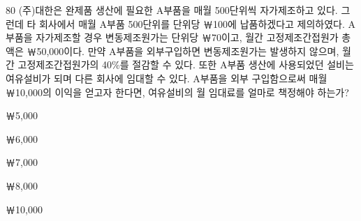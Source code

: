 \begin{question}{80}
(주)대한은 완제품 생산에 필요한 A부품을 매월 500단위씩 자가제조하고 있다. 그런데 타 회사에서 매월 A부품 500단위를 단위당 ￦100에 납품하겠다고 제의하였다. A부품을 자가제조할 경우 변동제조원가는 단위당 ￦70이고, 월간 고정제조간접원가 총액은 ￦50,000이다. 만약 A부품을 외부구입하면 변동제조원가는 발생하지 않으며, 월간 고정제조간접원가의 40\%를 절감할 수 있다. 또한 A부품 생산에 사용되었던 설비는 여유설비가 되며 다른 회사에 임대할 수 있다. A부품을 외부 구입함으로써 매월 ￦10,000의 이익을 얻고자 한다면, 여유설비의 월 임대료를 얼마로 책정해야 하는가?
\begin{choices}
  \item ￦5,000
  \item ￦6,000
  \item ￦7,000
  \item ￦8,000
  \item ￦10,000
\end{choices}
\end{question}
